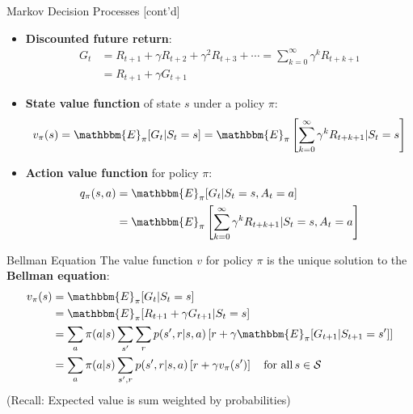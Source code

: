 \documentclass[ignorenonframetext,xcolor=x11names]{beamer}
\begin{document}
\begin{frame}{Markov Decision Processes \small [cont'd]}
\begin{itemize}
   \item \textbf{Discounted future return}:
\begin{align*}
G_t &= R_{t+1} + \gamma R_{t+2} + \gamma^2 R_{t+3} + \cdots = \sum_{k=0}^{\infty} \gamma^k R_{t+k+1} \\
    &= R_{t+1} + \gamma G_{t+1}
\end{align*}
  \item \textbf{State value function} of state $s$ under a policy $\pi$:
\begin{align*}
v_\pi(s) = \mathbbm{E}_\pi [ G_t | S_t = s] = \mathbbm{E}_\pi \left[ \sum_{k=0}^\infty \gamma^k R_{t + k + 1} | S_t = s \right]
\end{align*}
  \item \textbf{Action value function} for policy $\pi$:
\begin{align*}
q_\pi(s, a) &= \mathbbm{E}_\pi [ G_t | S_t = s, A_t = a] \\
&= \mathbbm{E}_\pi \left[ \sum_{k=0}^\infty \gamma^k R_{t + k + 1} | S_t = s, A_t = a \right]
\end{align*}
\end{itemize}
\end{frame}

\begin{frame}{Bellman Equation}
The value function $v$ for policy $\pi$ is the unique solution to the \textbf{Bellman equation}:
\begin{align*}
v_\pi(s) &= \mathbbm{E}_\pi [ G_t | S_t = s] \\
&= \mathbbm{E}_\pi [R_{t+1} + \gamma G_{t+1} | S_t = s] \\
&= \sum_a \pi(a | s) \sum_{s'} \sum_r p(s', r | s, a) \left[ r + \gamma \mathbbm{E}_\pi [ G_{t+1} | S_{t+1} = s'] \right] \\
&= \sum_a \pi(a | s) \sum_{s', r} p(s', r | s, a) \left[r + \gamma v_\pi(s') \right] \quad \text{for all} \, s \in \mathcal{S}
\end{align*}
\centering
\footnotesize{(Recall: Expected value is sum weighted by probabilities)}
\end{frame}
\end{document}
